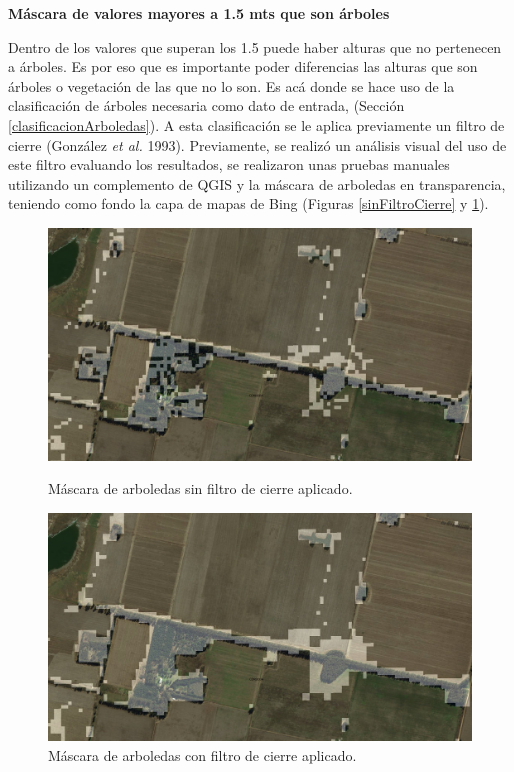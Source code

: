 \documentclass[10pt,a4paper, twoside]{report}
\begin{document}
\textbf{Máscara de valores mayores a 1.5 mts que son árboles}

Dentro de los valores que superan los 1.5 puede haber alturas que no pertenecen a árboles. Es por eso que es importante poder diferencias las alturas que son árboles o vegetación de las que no lo son. Es acá donde se hace uso de la clasificación de árboles necesaria como dato de entrada, (Sección \ref{clasificacionArboledas}). A esta clasificación se le aplica previamente un filtro de cierre (González \textit{et al.} 1993).
Previamente, se realizó un análisis visual del uso de este filtro evaluando los resultados, se realizaron unas pruebas manuales utilizando un complemento de QGIS y la máscara de arboledas en transparencia, teniendo como fondo la capa de mapas de Bing (Figuras \ref{sinFiltroCierre} y \ref{conFiltroCierre}).

\begin{figure}[H]
   \begin{minipage}{0.48\textwidth}
     \centering
     \includegraphics[width=1.0\linewidth]{imagenes/MascaraArbolesSinFiltro}
     \caption{Máscara de arboledas sin filtro de cierre aplicado.}\label{sinFiltroCierre}
   \end{minipage}\hfill
   \begin {minipage}{0.48\textwidth}
     \centering
     \includegraphics[width=1.0\linewidth]{imagenes/MascaraArbolesConFiltro}
     \caption{Máscara de arboledas con filtro de cierre aplicado.}\label{conFiltroCierre}
   \end{minipage}
\end{figure}
\end{document}
